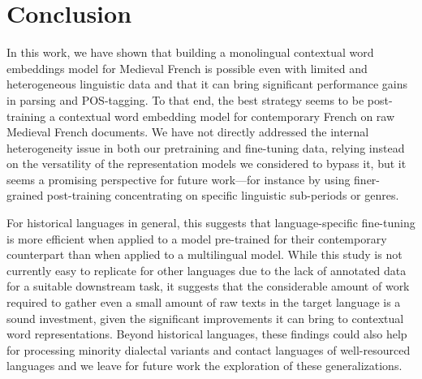 \section{Conclusion}

In this work, we have shown that building a monolingual contextual word embeddings model for Medieval French is possible even with limited and heterogeneous linguistic data and that it can bring significant performance gains in parsing and POS-tagging.
To that end, the best strategy seems to be post-training a contextual word embedding model for contemporary French on raw Medieval French documents.
We have not directly addressed the internal heterogeneity issue in both our pretraining and fine-tuning data, relying instead on the versatility of the representation models we considered to bypass it, but it seems a promising perspective for future work---for instance by using finer-grained post-training concentrating on specific linguistic sub-periods or genres.

For historical languages in general, this suggests that language-specific fine-tuning is more efficient when applied to a model pre-trained for their contemporary counterpart than when applied to a multilingual model.
While this study is not currently easy to replicate for other languages due to the lack of annotated data for a suitable downstream task, it suggests that the considerable amount of work required to gather even a small amount of raw texts in the target language is a sound investment, given the significant improvements it can bring to contextual word representations.
Beyond historical languages, these findings could also help for processing minority dialectal variants and contact languages of well-resourced languages and we leave for future work the exploration of these generalizations.